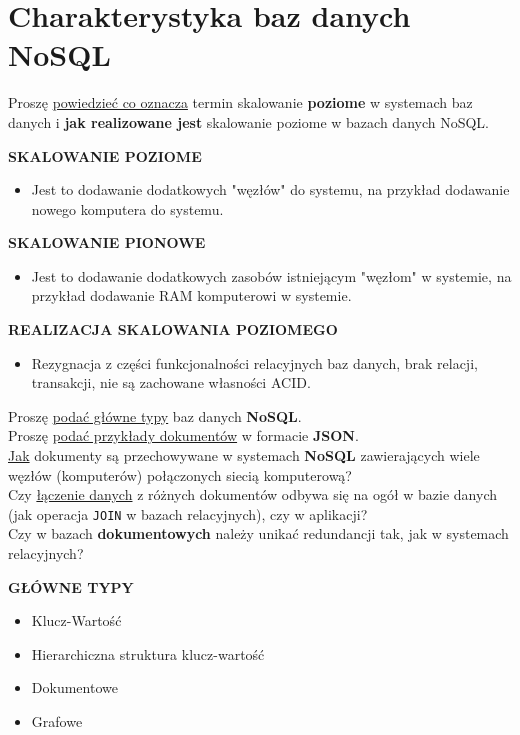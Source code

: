 \section{Charakterystyka baz danych NoSQL}
\label{sec:charakterystyka_baz_danych_nosql}

\horrule{0.5pt}
Proszę \underline{powiedzieć co oznacza} termin skalowanie \textbf{poziome}
w systemach baz danych i \textbf{jak realizowane jest} skalowanie poziome
w bazach danych NoSQL.\\
\horrule{0.5pt}

\vskip 0.5cm

\textbf{SKALOWANIE POZIOME}
\begin{itemize}
    \item Jest to dodawanie dodatkowych "węzłów" do systemu, na przykład
          dodawanie nowego komputera do systemu.
\end{itemize}

\textbf{SKALOWANIE PIONOWE}
\begin{itemize}
    \item Jest to dodawanie dodatkowych zasobów istniejącym "węzłom" w
    systemie, na przykład dodawanie RAM komputerowi w systemie.
\end{itemize}

\textbf{REALIZACJA SKALOWANIA POZIOMEGO}
\begin{itemize}
    \item Rezygnacja z części funkcjonalności relacyjnych baz danych,
          brak relacji, transakcji, nie są zachowane własności ACID.
\end{itemize}

\horrule{0.5pt}
Proszę \underline{podać główne typy} baz danych \textbf{NoSQL}.\\
Proszę \underline{podać przykłady dokumentów} w formacie \textbf{JSON}.\\
\underline{Jak} dokumenty są przechowywane w systemach \textbf{NoSQL}
zawierających wiele węzłów (komputerów) połączonych siecią komputerową?\\
Czy \underline{łączenie danych} z różnych dokumentów odbywa się na ogół w
bazie danych
(jak operacja \texttt{JOIN} w bazach relacyjnych), czy w aplikacji?\\
Czy w bazach \textbf{dokumentowych} należy unikać redundancji tak, jak w
systemach relacyjnych?\\
\horrule{0.5pt}

\vskip 0.5cm

\textbf{GŁÓWNE TYPY}
\begin{itemize}
    \item Klucz-Wartość
    \item Hierarchiczna struktura klucz-wartość
    \item Dokumentowe
    \item Grafowe
\end{itemize}

